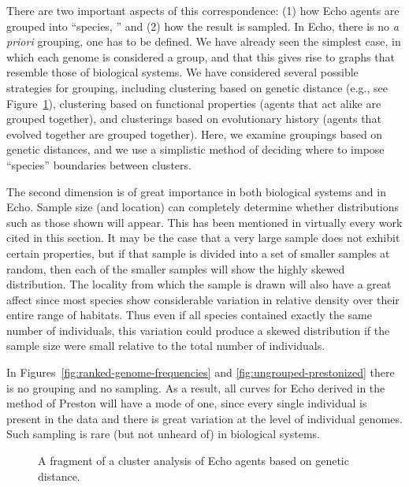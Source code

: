 There are two important aspects of this correspondence: (1) how Echo
agents are grouped into ``species, '' and (2) how the result is
sampled.  In Echo, there is no {\em a priori} grouping, one has to be
defined. We have already seen the simplest case, in which each genome
is considered a group, and that this gives rise to graphs that
resemble those of biological systems.  We have considered several
possible strategies for grouping, including clustering based on
genetic distance (e.g., see Figure~\ref{fig:clustering}), clustering
based on functional properties (agents that act alike are grouped
together), and clusterings based on evolutionary history (agents that
evolved together are grouped together).  Here, we examine groupings
based on genetic distances, and we use a simplistic method of deciding
where to impose ``species'' boundaries between clusters.

The second dimension is of great importance in both biological systems
and in Echo.  Sample size (and location) can completely determine
whether distributions such as those shown will appear. This has been
mentioned in virtually every work cited in this section.  It may be
the case that a very large sample does not exhibit certain properties,
but if that sample is divided into a set of smaller samples at random,
then each of the smaller samples will show the highly skewed
distribution. The locality from which the sample is drawn will also
have a great affect since most species show considerable variation in
relative density over their entire range of habitats.  Thus even if
all species contained exactly the same number of individuals, this
variation could produce a skewed distribution if the sample size were
small relative to the total number of individuals.

In Figures~\ref{fig:ranked-genome-frequencies} and
\ref{fig:ungrouped-prestonized} there is no grouping and no sampling.
As a result, all curves for Echo derived in the method of Preston will
have a mode of one, since every single individual is present in the
data and there is great variation at the level of individual genomes.
Such sampling is rare (but not unheard of) in biological systems.

\begin{figure}
\begin{center}
\leavevmode
\epsfysize=3in
\caption{A fragment of a cluster analysis of Echo agents based on
genetic distance.
\label{fig:clustering}}
\end{center}
\end{figure}


